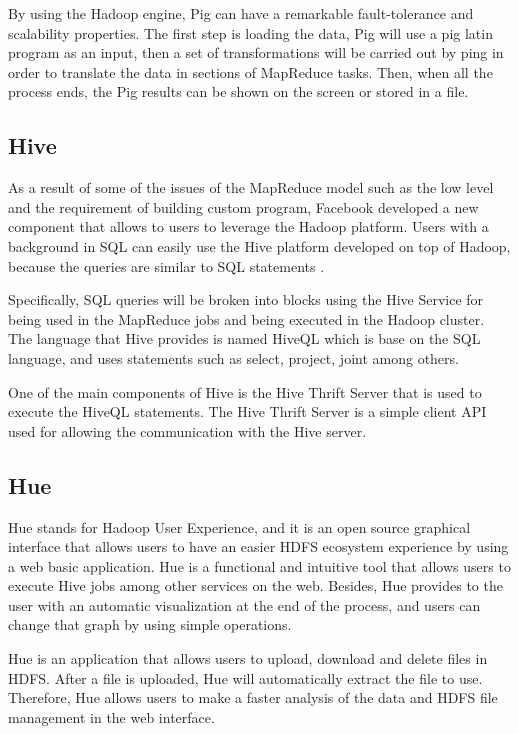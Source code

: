 By using the Hadoop engine, Pig can have a remarkable fault-tolerance and scalability properties. 
The first step is loading the data, Pig will use a pig latin program as an input, then a set of transformations will be carried out by ping in order to translate the data in sections of MapReduce tasks. Then, when all the process ends, the Pig results can be shown on the screen or stored in a file.
 
\subsection{Hive}

As a result of some of the issues of the MapReduce model such as the low level and the requirement of building custom program, Facebook developed a new component that allows to users to leverage the Hadoop platform.  Users with a background in SQL can easily use the Hive platform developed on top of Hadoop, because the queries are similar to SQL statements \cite{thusoo2009hive}.

Specifically, SQL queries will be broken into blocks using the Hive Service for being used in the MapReduce jobs and being executed in the Hadoop cluster. The language that Hive provides is named HiveQL which is base on the SQL language, and uses statements such as select, project, joint among others. 

One of the main components of Hive is the Hive Thrift Server that is used to execute the HiveQL statements. The Hive Thrift Server is a simple client API used for allowing the communication with the Hive server. 
  
\subsection{Hue}

Hue \cite{rasheed2013fedora} stands for Hadoop User Experience, and it is an open source graphical interface that allows users to have an easier HDFS ecosystem experience by using a web basic application. Hue is a functional and intuitive tool that allows users to execute Hive jobs among other services on the web. Besides, Hue provides to the user with an automatic visualization at the end of the process, and users can change that graph by using simple operations.

Hue \cite{b2016professionalhadoop} is an application that allows users to upload, download and delete files in HDFS. After a file is uploaded, Hue will automatically extract the file to use. Therefore, Hue allows users to make a faster analysis of the data and HDFS file management in the web interface. 


